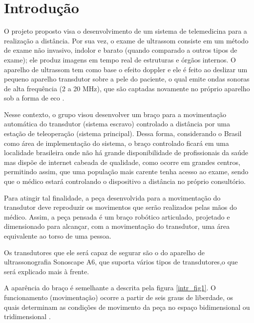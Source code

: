 \chapter{Introdução}

O projeto proposto visa o desenvolvimento de um sistema de telemedicina para a realização a distância. Por sua vez, o exame de ultrassom consiste em um método de exame não invasivo, indolor e barato (quando comparado a outros tipos de exame); ele produz imagens em tempo real de estruturas e órgãos internos. O aparelho de ultrassom tem como base o efeito doppler e ele é feito ao deslizar um pequeno aparelho transdutor sobre a pele do paciente, o qual emite ondas sonoras de alta frequência (2 a 20 MHz), que são captadas novamente no próprio aparelho sob a forma de eco \cite{ultrasomexame}.

Nesse contexto, o grupo visou desenvolver um braço para a movimentação automática do transdutor (sistema escravo) controlado a distância por uma estação de teleoperação (sistema principal). Dessa forma, considerando o Brasil como área de implementação do sistema, o braço controlado ficará em uma localidade brasileira onde não há grande disponibilidade de profissionais da saúde mas dispõe de internet cabeada de qualidade, como ocorre em grandes centros, permitindo assim, que uma população mais carente tenha acesso ao exame, sendo que o médico estará controlando o dispositivo a distância no próprio consultório.

Para atingir tal finalidade, a peça desenvolvida para a movimentação do transdutor deve reproduzir os movimentos que serão realizados pelas mãos do médico. Assim, a peça pensada é um braço robótico articulado, projetado e dimensionado para alcançar, com a movimentação do transdutor, uma área equivalente ao torso de uma pessoa.

Os transdutores que ele será capaz de segurar são o do aparelho de ultrassonografia Sonoscape A6, que suporta vários tipos de transdutores,o que será explicado mais à frente.

A aparência do braço é semelhante a descrita pela figura \ref{intr_fig1}. O funcionamento (movimentação) ocorre a partir de seis graus de liberdade, os quais determinam as condições de movimento da peça no espaço bidimensional ou tridimensional \cite{valdemircarrara2011}.

